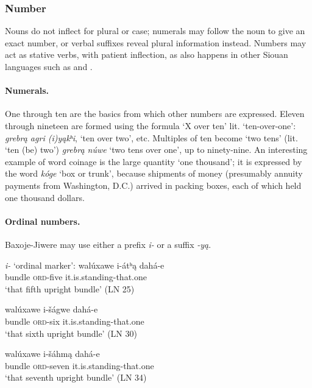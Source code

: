 \documentclass[output=paper]{LSP/langsci}
\begin{document}
\subsubsection{Number}  
Nouns do not inflect for plural or case; numerals may follow the noun to give an exact number, or verbal suffixes reveal plural information instead.  Numbers may act as stative verbs, with  patient inflection, as also happens in other Siouan languages such as  \citep[481]{Rankin2005b} and  \citep[708]{Ullrich2008}.  

\largerpage
\paragraph*{Numerals.}  One through ten are the basics from which other numbers are expressed. Eleven through nineteen are formed using the formula `X over ten' {lit. `ten-over-one'}: \textit{grebr\k{a} agri (i)y\k{a}kʰi}, `ten over two', etc. Multiples of ten become `two tens' (lit. `ten (be) two') \textit{grebr\k{a} núwe} `two tens over one',  up to ninety-nine.  An interesting example of word coinage is the large quantity `one thousand'; it is expressed by the word \textit{kóge} `box or trunk', because shipments of money (presumably annuity payments from Washington, D.C.) arrived in packing boxes, each of which held one thousand dollars.
											
\noindent
\paragraph*{Ordinal numbers.}  Baxoje-Jiwere may use either a prefix \textit{i-} or a suffix \textit{-y\k{a}}.

\textit{i-} `ordinal marker': \citep[{\upshape ``The Giant'' Bk2}]{Marsh1936}
\ea 
\gll  walúxawe i-átʰ\k{a}  dahá-e   \\
bundle      \textsc{ord}-five     it.is.standing-that.one \\
\trans `that fifth upright bundle' (LN 25) 
			
\ex 
\gll  walúxawe i-\v{s}ágwe dahá-e  \\
bundle      \textsc{ord}-six     it.is.standing-that.one \\
\trans `that sixth upright bundle' (LN 30)

\ex 
\gll walúxawe  i-\v{s}áhm\k{a}  dahá-e \\  
bundle     \textsc{ord}-seven    it.is.standing-that.one \\
\trans {}`that seventh upright bundle' (LN 34)
\z
\end{document}
